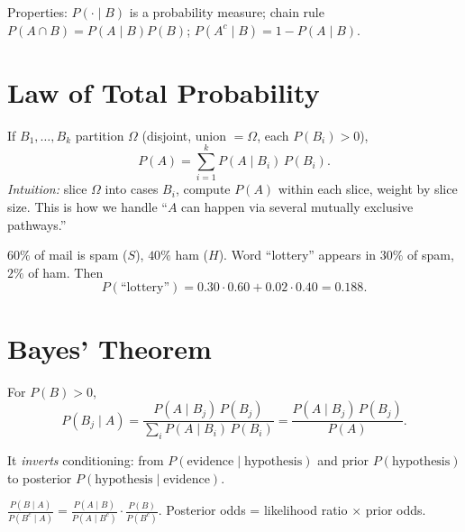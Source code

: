 Properties: $P(\cdot\mid B)$ is a probability measure; chain rule $P(A\cap B)=P(A\mid B)P(B)$; $P(A^c\mid B)=1-P(A\mid B)$.

\section{Law of Total Probability}
\label{sec:total-prob}
If $B_1,\dots,B_k$ partition $\Omega$ (disjoint, union $=\Omega$, each $P(B_i)>0$),
\[
P(A)=\sum_{i=1}^k P(A\mid B_i)\,P(B_i).
\]
\emph{Intuition:} slice $\Omega$ into cases $B_i$, compute $P(A)$ within each slice, weight by slice size. This is how we handle ``$A$ can happen via several mutually exclusive pathways.''

\begin{example} $60\%$ of mail is spam ($S$), $40\%$ ham ($H$). Word ``lottery'' appears in $30\%$ of spam, $2\%$ of ham. Then
\[
P(\text{``lottery''})=0.30\cdot0.60+0.02\cdot0.40=0.188.
\]
\end{example}

\section{Bayes' Theorem}
\label{sec:bayes}

\begin{theorem} For $P(B)>0$,
\[
P(B_j\mid A)=\frac{P(A\mid B_j)\,P(B_j)}{\sum_i P(A\mid B_i)\,P(B_i)}=\frac{P(A\mid B_j)\,P(B_j)}{P(A)}.
\]
\end{theorem}
It \emph{inverts} conditioning: from $P(\text{evidence}\mid\text{hypothesis})$ and prior $P(\text{hypothesis})$ to posterior $P(\text{hypothesis}\mid\text{evidence})$.

\begin{corollary} $\displaystyle\frac{P(B\mid A)}{P(B^c\mid A)}=\frac{P(A\mid B)}{P(A\mid B^c)}\cdot\frac{P(B)}{P(B^c)}$. Posterior odds = likelihood ratio $\times$ prior odds.
\end{corollary}

